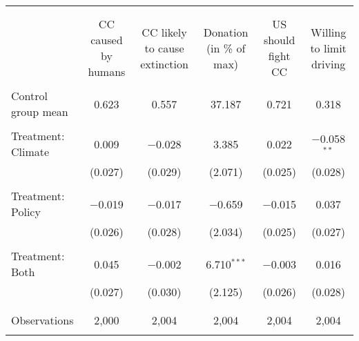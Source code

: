 
\begin{tabular}{@{\extracolsep{5pt}}lccccc} 
\\[-1.8ex]\hline 
\hline \\[-1.8ex] 
\\[-1.8ex] & CC caused by humans & CC likely to cause extinction & Donation (in \% of max) & US should fight CC & Willing to limit driving \\ 
\hline \\[-1.8ex] 
 Control group mean & 0.623 & 0.557 & 37.187 & 0.721 & 0.318  \\ \hline \\[-1.8ex] Treatment: Climate & 0.009 & $-$0.028 & 3.385 & 0.022 & $-$0.058$^{**}$ \\ 
  & (0.027) & (0.029) & (2.071) & (0.025) & (0.028) \\ 
  & & & & & \\ 
 Treatment: Policy & $-$0.019 & $-$0.017 & $-$0.659 & $-$0.015 & 0.037 \\ 
  & (0.026) & (0.028) & (2.034) & (0.025) & (0.027) \\ 
  & & & & & \\ 
 Treatment: Both & 0.045 & $-$0.002 & 6.710$^{***}$ & $-$0.003 & 0.016 \\ 
  & (0.027) & (0.030) & (2.125) & (0.026) & (0.028) \\ 
  & & & & & \\ 
\hline \\[-1.8ex] 

Observations & 2,000 & 2,004 & 2,004 & 2,004 & 2,004 \\ 
\hline 
\hline \\[-1.8ex] 
\end{tabular} 